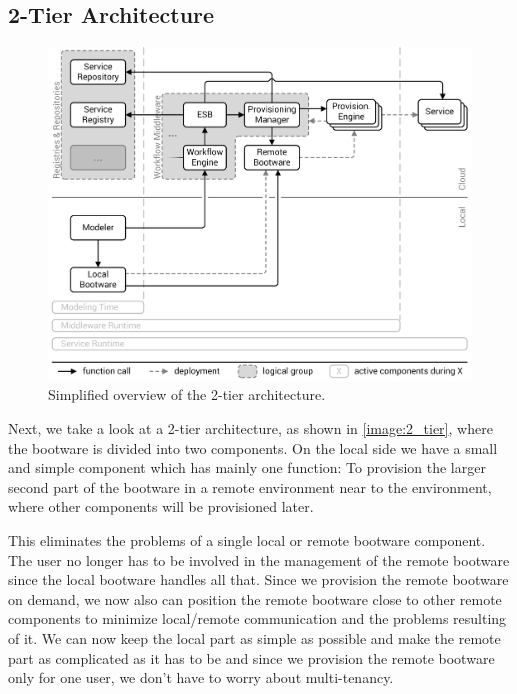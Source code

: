 \subsection{2-Tier Architecture}
\label{design:division:2tier}

\begin{figure}[!htbp]
	\centering
	\includegraphics[resolution=600]{design/assets/2_tier}
	\caption{Simplified overview of the 2-tier architecture.}
	\label{image:2_tier}
\end{figure}

Next, we take a look at a 2-tier architecture, as shown in \autoref{image:2_tier}, where the bootware is divided into two components.
On the local side we have a small and simple component which has mainly one function: To provision the larger second part of the bootware in a remote environment near to the environment, where other components will be provisioned later.

This eliminates the problems of a single local or remote bootware component.
The user no longer has to be involved in the management of the remote bootware since the local bootware handles all that.
Since we provision the remote bootware on demand, we now also can position the remote bootware close to other remote components to minimize local/remote communication and the problems resulting of it.
We can now keep the local part as simple as possible and make the remote part as complicated as it has to be and since we provision the remote bootware only for one user, we don't have to worry about multi-tenancy.

